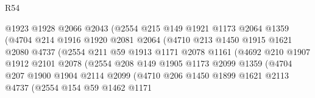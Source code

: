 \begin{lexlean}{R54}
\begin{coremodule}
                            @1923
                            @1928
                            @2066
                            @2043
                            (@2554
                              @215
                              @149
                              @1921
                              @1173
                              @2064
                              @1359
                              (@4704
                                @214
                                @1916
                                @1920
                                @2081
                                @2064
                                (@4710
                                  @213
                                  @1450
                                  @1915
                                  @1621
                                  @2080
                                  @4737
                                  (@2554
                                    @211
                                    @59
                                    @1913
                                    @1171
                                    @2078
                                    @1161
                                    (@4692
                                      @210
                                      @1907
                                      @1912
                                      @2101
                                      @2078
                                      (@2554
                                        @208
                                        @149
                                        @1905
                                        @1173
                                        @2099
                                        @1359
                                        (@4704
                                          @207
                                          @1900
                                          @1904
                                          @2114
                                          @2099
                                          (@4710
                                            @206
                                            @1450
                                            @1899
                                            @1621
                                            @2113
                                            @4737
                                            (@2554
                                              @154
                                              @59
                                              @1462
                                              @1171

\end{coremodule}
\end{lexlean}
